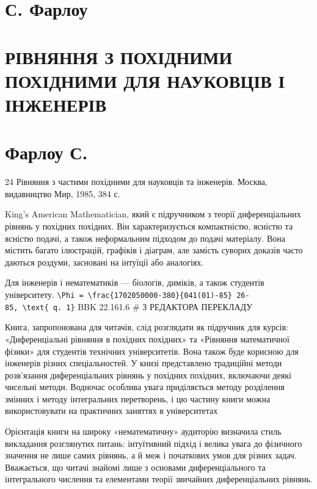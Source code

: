 \documentclass[
  ukrainian,
]{article}
\author{}
\date{}
\begin{document}
\section{С. Фарлоу}\label{ux441.-ux444ux430ux440ux43bux43eux443}

\section{РІВНЯННЯ З ПОХІДНИМИ ПОХІДНИМИ ДЛЯ НАУКОВЦІВ І
ІНЖЕНЕРІВ}\label{ux440ux456ux432ux43dux44fux43dux43dux44f-ux437-ux43fux43eux445ux456ux434ux43dux438ux43cux438-ux43fux43eux445ux456ux434ux43dux438ux43cux438-ux434ux43bux44f-ux43dux430ux443ux43aux43eux432ux446ux456ux432-ux456-ux456ux43dux436ux435ux43dux435ux440ux456ux432}

\section{Фарлоу С.}\label{ux444ux430ux440ux43bux43eux443-ux441.}

24 Рівняння з частими похідними для науковців та інженерів. Москва,
видавництво Мир, 1985, 384 с.

King's American Mathematician, який є підручником з теорії
диференціальних рівнянь у похідних похідних. Він характеризується
компактністю, ясністю та ясністю подачі, а також неформальним підходом
до подачі матеріалу. Вона містить багато ілюстрацій, графіків і діаграм,
але замість суворих доказів часто даються роздуми, засновані на інтуїції
або аналогіях.

Для інженерів і нематематиків --- біологів, диміків, а також студентів
університету.
\texttt{\textbackslash{}Phi\ =\ \textbackslash{}frac\{1702050000-380\}\{041(01)-85\}\ 26-85,\ \textbackslash{}text\{\ q.\ 1\}}
BBK 22.161.6 \# З РЕДАКТОРА ПЕРЕКЛАДУ

Книга, запропонована для читачів, слід розглядати як підручник для
курсів: «Диференціальні рівняння в похідних похідних» та «Рівняння
математичної фізики» для студентів технічних університетів. Вона також
буде корисною для інженерів різних спеціальностей. У книзі представлено
традиційні методи розв'язання диференціальних рівнянь у похідних
похідних, включаючи деякі чисельні методи. Водночас особлива увага
приділяється методу розділення змінних і методу інтегральних
перетворень, і цю частину книги можна використовувати на практичних
заняттях в університетах

Орієнтація книги на широку «нематематичну» аудиторію визначила стиль
викладання розглянутих питань: інтуїтивний підхід і велика увага до
фізичного значення не лише самих рівнянь, а й меж і початкових умов для
різних задач. Вважається, що читачі знайомі лише з основами
диференціального та інтегрального числення та елементами теорії
звичайних диференціальних рівнянь.
\end{document}
